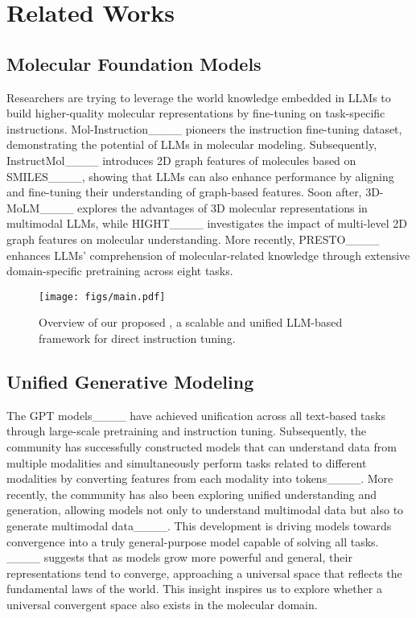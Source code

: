 \section{Related Works}
\subsection{Molecular Foundation Models}
Researchers are trying to leverage the world knowledge embedded in LLMs to build higher-quality molecular representations by fine-tuning on task-specific instructions.
Mol-Instruction____ pioneers the instruction fine-tuning dataset, demonstrating the potential of LLMs in molecular modeling. Subsequently, InstructMol____ introduces 2D graph features of molecules based on SMILES____, showing that LLMs can also enhance performance by aligning and fine-tuning their understanding of graph-based features. Soon after, 3D-MoLM____ explores the advantages of 3D molecular representations in multimodal LLMs, while HIGHT____ investigates the impact of multi-level 2D graph features on molecular understanding. More recently, PRESTO____ enhances LLMs' comprehension of molecular-related knowledge through extensive domain-specific pretraining across eight tasks. 

\begin{figure*}[t]
    \centering
    \texttt{[image: figs/main.pdf]} 
    \vspace{-0.3cm}
    \caption{Overview of our proposed \method, a scalable and unified LLM-based framework for direct instruction tuning.}
    \label{fig:main fig}
\end{figure*}

\subsection{Unified Generative Modeling}
The GPT models____ have achieved unification across all text-based tasks through large-scale pretraining and instruction tuning. Subsequently, the community has successfully constructed models that can understand data from multiple modalities and simultaneously perform tasks related to different modalities by converting features from each modality into tokens____. More recently, the community has also been exploring unified understanding and generation, allowing models not only to understand multimodal data but also to generate multimodal data____. This development is driving models towards convergence into a truly general-purpose model capable of solving all tasks. ____ suggests that as models grow more powerful and general, their representations tend to converge, approaching a universal space that reflects the fundamental laws of the world. 
This insight inspires us to explore whether a universal convergent space also exists in the molecular domain.